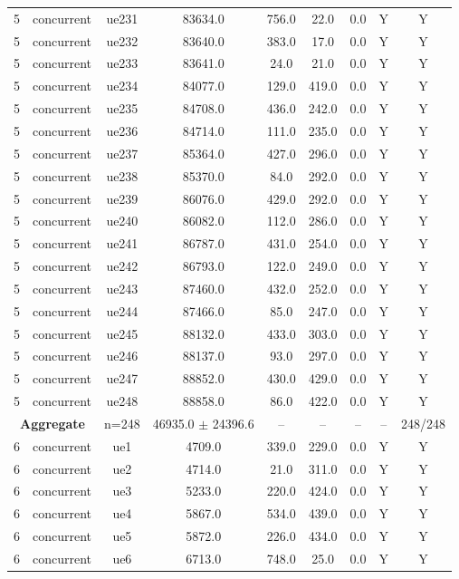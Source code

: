 \begin{table}[ht]
\begin{tabular}{|c|c|c|c|c|c|c|c|c|}
5 & concurrent & ue231 & 83634.0 & 756.0 & 22.0 & 0.0 & Y & Y \\
5 & concurrent & ue232 & 83640.0 & 383.0 & 17.0 & 0.0 & Y & Y \\
5 & concurrent & ue233 & 83641.0 & 24.0 & 21.0 & 0.0 & Y & Y \\
5 & concurrent & ue234 & 84077.0 & 129.0 & 419.0 & 0.0 & Y & Y \\
5 & concurrent & ue235 & 84708.0 & 436.0 & 242.0 & 0.0 & Y & Y \\
5 & concurrent & ue236 & 84714.0 & 111.0 & 235.0 & 0.0 & Y & Y \\
5 & concurrent & ue237 & 85364.0 & 427.0 & 296.0 & 0.0 & Y & Y \\
5 & concurrent & ue238 & 85370.0 & 84.0 & 292.0 & 0.0 & Y & Y \\
5 & concurrent & ue239 & 86076.0 & 429.0 & 292.0 & 0.0 & Y & Y \\
5 & concurrent & ue240 & 86082.0 & 112.0 & 286.0 & 0.0 & Y & Y \\
5 & concurrent & ue241 & 86787.0 & 431.0 & 254.0 & 0.0 & Y & Y \\
5 & concurrent & ue242 & 86793.0 & 122.0 & 249.0 & 0.0 & Y & Y \\
5 & concurrent & ue243 & 87460.0 & 432.0 & 252.0 & 0.0 & Y & Y \\
5 & concurrent & ue244 & 87466.0 & 85.0 & 247.0 & 0.0 & Y & Y \\
5 & concurrent & ue245 & 88132.0 & 433.0 & 303.0 & 0.0 & Y & Y \\
5 & concurrent & ue246 & 88137.0 & 93.0 & 297.0 & 0.0 & Y & Y \\
5 & concurrent & ue247 & 88852.0 & 430.0 & 429.0 & 0.0 & Y & Y \\
5 & concurrent & ue248 & 88858.0 & 86.0 & 422.0 & 0.0 & Y & Y \\
\multicolumn{2}{|c|}{\textbf{Aggregate}} & n=248 & 46935.0 $\pm$ 24396.6 & -- & -- & -- & -- & 248/248 \\
\hline
6 & concurrent & ue1 & 4709.0 & 339.0 & 229.0 & 0.0 & Y & Y \\
6 & concurrent & ue2 & 4714.0 & 21.0 & 311.0 & 0.0 & Y & Y \\
6 & concurrent & ue3 & 5233.0 & 220.0 & 424.0 & 0.0 & Y & Y \\
6 & concurrent & ue4 & 5867.0 & 534.0 & 439.0 & 0.0 & Y & Y \\
6 & concurrent & ue5 & 5872.0 & 226.0 & 434.0 & 0.0 & Y & Y \\
6 & concurrent & ue6 & 6713.0 & 748.0 & 25.0 & 0.0 & Y & Y \\

\end{tabular}
\end{table}
